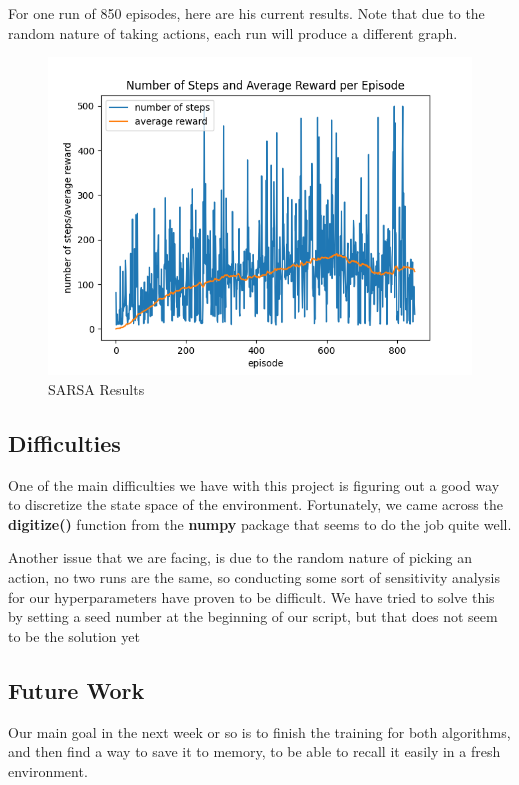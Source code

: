 \documentclass[nohyperref]{article}
\theoremstyle{plain}
\theoremstyle{definition}
\theoremstyle{remark}
\newcommand{\cnote}[1]{\textsf{\color{blue} [#1]}}
\begin{document}
For one run of 850 episodes, here are his current results. Note that due to the random nature of taking actions, each run will produce a different graph.

\begin{figure}[H] %
    \centering
    \includegraphics[width=1\linewidth]{sarsa-average.png}
    \caption{SARSA Results}
\end{figure}

\subsection*{Difficulties}

One of the main difficulties we have with this project is figuring out a good way to discretize the state space of the environment.
Fortunately, we came across the \textbf{digitize()} function from the \textbf{numpy} package that seems to do the job quite well.

Another issue that we are facing, is due to the random nature of picking an action, no two runs are the same, so conducting some sort of
sensitivity analysis for our hyperparameters have proven to be difficult. We have tried to solve this by setting a seed number at the beginning
of our script, but that does not seem to be the solution yet

\subsection*{Future Work}

Our main goal in the next week or so is to finish the training for both algorithms, and then find a way to save it to memory, to be able 
to recall it easily in a fresh environment.



\end{document}
